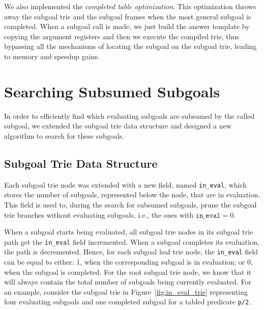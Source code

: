We also implemented the \textit{completed table optimization}. This optimization throws
away the subgoal trie and the subgoal frames when the most general subgoal is completed.
When a subgoal call is made, we just build the answer template by copying the argument
registers and then we execute the compiled trie, thus bypassing all the mechanisms of
locating the subgoal on the subgoal trie, leading to memory and speedup gains. 

\section{Searching Subsumed Subgoals}\label{sec:searching_subsumed}

In order to efficiently find which evaluating subgoals are subsumed
by the called subgoal, we extended the subgoal trie data structure and designed a new
algorithm to search for these subgoals.

\subsection{Subgoal Trie Data Structure}

Each subgoal trie node was extended with a new field, named
\texttt{in\_eval}, which stores the number of subgoals, represented below the
node, that are in evaluation. This field is used to, during the search
for subsumed subgoals, prune the subgoal trie branches without
evaluating subgoals, i.e., the ones with $\texttt{in\_eval} = 0$.

When a subgoal starts being evaluated, all subgoal trie nodes in its
subgoal trie path get the \texttt{in\_eval} field incremented. When a subgoal
completes its evaluation, the path is decremented. Hence, for each
subgoal leaf trie node, the \texttt{in\_eval} field can be equal to either:
1, when the corresponding subgoal is in evaluation; or 0, when the
subgoal is completed. For the root subgoal trie node, we know that it
will always contain the total number of subgoals being currently
evaluated. For an example, consider the subgoal trie in
Figure~\ref{fig:in_eval_trie} representing four evaluating subgoals and
one completed subgoal for a tabled predicate \texttt{p/2}.

